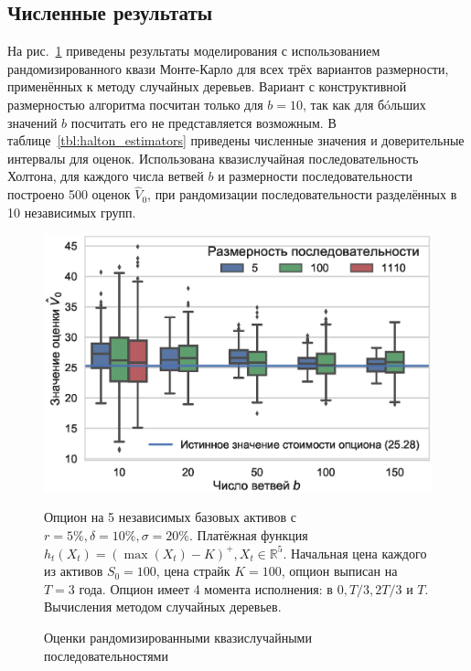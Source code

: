 \documentclass[specialist,
               substylefile = ../spbu.rtx,
               subf,href,colorlinks=true, 12pt]{disser}
\begin{document}

\subsection{Численные результаты} %
\label{sub:numerical_results}

На рис.~\ref{fig:halton_estimators} приведены результаты моделирования с использованием рандомизированного квази Монте-Карло для всех трёх вариантов размерности, применённых к методу случайных деревьев. Вариант с конструктивной размерностью алгоритма посчитан только для $b = 10$, так как для б\'oльших значений $b$ посчитать его не представляется возможным. В таблице~\ref{tbl:halton_estimators} приведены численные значения и доверительные интервалы для оценок. Использована квазислучайная последовательность Холтона, для каждого числа ветвей $b$ и размерности последовательности построено 500 оценок $\hat V_0$, при рандомизации последовательности разделённых в 10 независимых групп.

\begin{figure}[h]
    \centering
	\includegraphics[width=\textwidth]{halton_estimators.eps}
	\caption{Оценки рандомизированными квазислучайными последовательностями}
	\footnotesize Опцион на 5 независимых базовых активов с $r = 5\%, \delta = 10\%, \sigma = 20\%$. Платёжная функция $h_t(X_t) = \left(\max(X_t) - K\right)^+, X_t\in \mathbb R^5$. Начальная цена каждого из активов $S_0 = 100$, цена страйк $K = 100$, опцион выписан на $T=3$ года. Опцион имеет 4 момента исполнения: в $0, T/3, 2T/3$ и $T$. Вычисления методом случайных деревьев.
	\label{fig:halton_estimators}
\end{figure}
\end{document}
